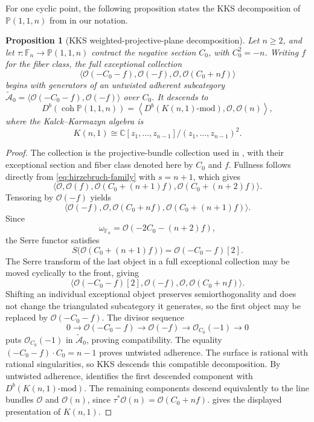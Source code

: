 \documentclass[11pt]{article}
\theoremstyle{plain}
\newtheorem{proposition}[proposition]{Proposition}
\theoremstyle{definition}
\theoremstyle{remark}
\newcommand{\Pp}{\mathbb P}
\newcommand{\F}{\mathbb F}
\newcommand{\C}{\mathbb C}
\newcommand{\Db}{D^b}
\newcommand{\coh}{\operatorname{coh}}
\newcommand{\OO}{\mathcal O}
\begin{document}
For one cyclic point, the following proposition
states the KKS decomposition of \(\Pp(1,1,n)\) from
\cite[Example~3.17]{KKS2020} in our notation.

\begin{proposition}[KKS weighted-projective-plane decomposition]
\label{prop:kks-weighted-plane}
Let \(n\geq2\), and let \(\tau:\F_n\to\Pp(1,1,n)\) contract the
negative section \(C_0\), with \(C_0^2=-n\). Writing \(f\) for the
fiber class, the full exceptional collection
\[
\langle\OO(-C_0-f),\OO(-f),\OO,\OO(C_0+nf)\rangle
\]
begins with generators of an untwisted adherent subcategory
\(\widetilde{\mathcal A}_0=
\langle\OO(-C_0-f),\OO(-f)\rangle\) over \(C_0\).
It descends to
\[
\Db(\coh\Pp(1,1,n))=
\left\langle\Db(K(n,1)\text{-mod}),\OO,\OO(n)\right\rangle,
\]
where the Kalck--Karmazyn algebra is
\[
K(n,1)\cong\C[z_1,\ldots,z_{n-1}]/(z_1,\ldots,z_{n-1})^2.
\]
\end{proposition}

\begin{proof}
The collection is the projective-bundle collection used in
\cite[Example~3.17]{KKS2020}, with their exceptional section and fiber
class denoted here by \(C_0\) and \(f\). Fullness follows directly from
\eqref{eq:hirzebruch-family} with \(s=n+1\), which gives
\[
\langle\OO,\OO(f),\OO(C_0+(n+1)f),\OO(C_0+(n+2)f)\rangle.
\]
Tensoring by \(\OO(-f)\) yields
\[
\langle\OO(-f),\OO,\OO(C_0+nf),\OO(C_0+(n+1)f)\rangle.
\]
Since
\[
\omega_{\F_n}=\OO(-2C_0-(n+2)f),
\]
the Serre functor satisfies
\[
S\bigl(\OO(C_0+(n+1)f)\bigr)
=\OO(-C_0-f)[2].
\]
The Serre transform of the last object in a full exceptional collection
may be moved cyclically to the front, giving
\[
\langle\OO(-C_0-f)[2],\OO(-f),\OO,\OO(C_0+nf)\rangle.
\]
Shifting an individual exceptional object preserves semiorthogonality and
does not change the triangulated subcategory it generates, so the first
object may be replaced by \(\OO(-C_0-f)\). The divisor sequence
\[
0\longrightarrow\OO(-C_0-f)\longrightarrow\OO(-f)
\longrightarrow\OO_{C_0}(-1)\longrightarrow0
\]
puts \(\OO_{C_0}(-1)\) in \(\widetilde{\mathcal A}_0\), proving
compatibility. The equality
\((-C_0-f)\cdot C_0=n-1\) proves untwisted adherence.
The surface is rational with rational singularities, so KKS
\cite[Theorem~2.12(i)]{KKS2020} descends this compatible decomposition.
By untwisted adherence, \cite[Theorem~3.16]{KKS2020} identifies the first
descended component with \(\Db(K(n,1)\text{-mod})\). The remaining components descend
equivalently to the line bundles \(\OO\) and \(\OO(n)\), since
\(\tau^*\OO(n)=\OO(C_0+nf)\).
\cite[Example~3.14(2)]{KKS2020} gives the displayed presentation of
\(K(n,1)\).
\end{proof}
\end{document}
